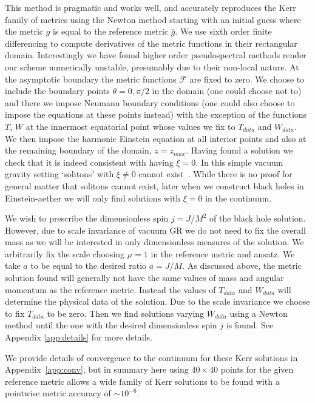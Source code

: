 \documentclass[12pt]{article}
\numberwithin{equation}{section}
\begin{document}
This method is pragmatic and works well, and accurately reproduces the Kerr family of metrics using the Newton method starting with an initial guess where the metric $g$ is equal to the reference metric $\bar{g}$.
We use sixth order finite differencing to compute derivatives of the metric functions in their rectangular domain. Interestingly we have found higher order pseudospectral methods render our scheme numerically unstable, presumably due to their non-local nature.
At the asymptotic boundary the metric functions $\mathcal{F}$ are fixed to zero. We choose to include the boundary points $\theta = 0, \pi/2$ in the domain (one could choose not to) and there we impose Neumann boundary conditions (one could also choose to impose the equations at these points instead) with the exception of the functions $T$, $W$ at the innermost equatorial point whose values we fix to $T_{data}$ and $W_{data}$. We then impose the harmonic Einstein equation at all interior points and also at the remaining boundary of the domain, $z = z_{max}$. Having found a solution we check that it is indeed consistent with having $\xi = 0$. In this simple vacuum gravity setting `solitons' with $\xi \ne 0$ cannot exist~\cite{Figueras:2016nmo}. While there is no proof for general matter that solitons cannot exist, later when we construct black holes in Einstein-aether we will only find solutions with $\xi = 0$ in the continuum.

We wish to prescribe the dimensionless spin $j = J/M^2$ of the black hole solution. However, due to scale invariance of vacuum GR we do not need to fix the overall mass as we will be interested in only dimensionless measures of the solution.
We arbitrarily fix the scale choosing $\mu = 1$ in the reference metric and ansatz. 
We take $a$ to be equal to the desired ratio $a = J/M$. As discussed above, the metric solution found will generally not have the same values of mass and angular momentum as the reference metric. Instead the values of $T_{data}$ and $W_{data}$ will determine the physical data of the solution. 
Due to the scale invariance we choose to fix $T_{data}$ to be zero. Then we find solutions varying $W_{data}$ using a Newton method until the one with the desired dimensionless spin $j$ is found. See Appendix \ref{app:details} for more details.


We provide details of convergence to the continuum for these Kerr solutions in Appendix~\ref{app:conv}, but in summary here using $40 \times 40$ points for the given reference metric allows a wide family of Kerr solutions to be found with a pointwise metric accuracy of $\sim 10^{-6}$.
\end{document}

